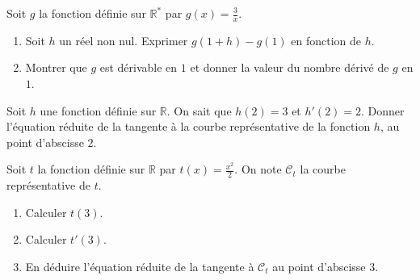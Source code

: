 \documentclass[11pt]{article}
\begin{document}
\begin{exo}
  Soit $g$ la fonction définie sur $\mathbb{R}^*$ par $g(x) = \frac{3}{x}$.
  \begin{enumerate}
    \item Soit $h$ un réel non nul. Exprimer $g(1+h)-g(1)$ en fonction de $h$.
    \item Montrer que $g$ est dérivable en $1$ et donner la valeur du nombre
      dérivé de $g$ en $1$.
  \end{enumerate}
\end{exo}

\begin{exo}
  Soit $h$ une fonction définie sur $\mathbb{R}$. On sait que $h(2)=3$ et
  $h'(2)=2$. Donner l'équation réduite de la tangente à la courbe représentative
  de la fonction $h$, au point d'abscisse $2$.
\end{exo}

\begin{exo}
  Soit $t$ la fonction définie sur $\mathbb{R}$ par $t(x) = \frac{x^2}{2}$. On
  note $\mathcal C_t$ la courbe représentative de $t$.
  \begin{enumerate}
    \item Calculer $t(3)$.
    \item Calculer $t'(3)$.
    \item En déduire l'équation réduite de la tangente à 
      $\mathcal C_t$ au point d'abscisse $3$.
  \end{enumerate}
\end{exo}
\end{document}

